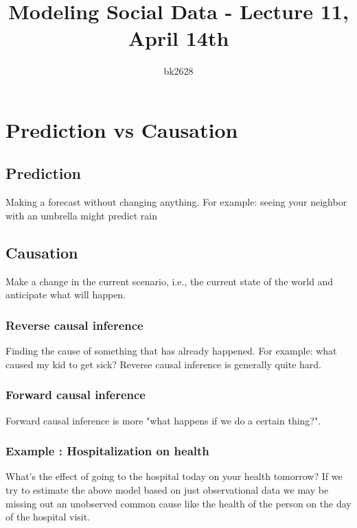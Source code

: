 \documentclass[a4paper]{article}
\title{Modeling Social Data - Lecture 11, April 14th}
\author{bk2628}
\begin{document}
\maketitle

\doublespacing


\section{Prediction vs Causation}
\subsection{Prediction}
Making a forecast without changing anything.
For example: seeing your neighbor with an umbrella might predict rain

\subsection{Causation}
Make a change in the current scenario, i.e., the current state of the world and anticipate what will happen.

\subsubsection{Reverse causal inference}
Finding the cause of something that has already happened.
For example: what caused my kid to get sick?
Reverse causal inference is generally quite hard.
\subsubsection{Forward causal inference}
Forward causal inference is more "what happens if we do a certain thing?".

\subsubsection{Example : Hospitalization on health}
What's the effect of going to the hospital today on your health tomorrow?
If we try to estimate the above model based on just observational data we may be missing out an unobserved common cause like the health of the person on the day of the hospital visit.
\end{document}
